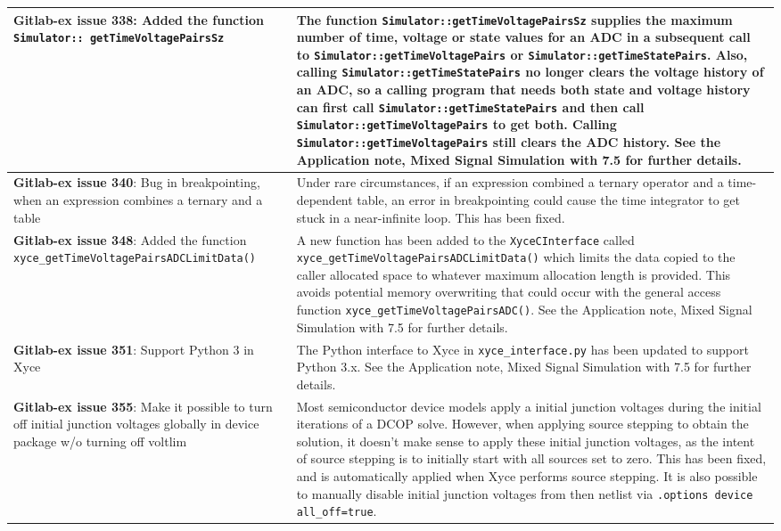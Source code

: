 {\begin{longtable}[h] {>{\raggedright\small}m{2in}|>{\raggedright\let\\\tabularnewline\small}m{3.5in}}
\textbf{Gitlab-ex issue 338}: Added the function \texttt{Simulator:: getTimeVoltagePairsSz} &
The function \texttt{Simulator::getTimeVoltagePairsSz} supplies the
maximum number of time, voltage or state values for an ADC in a
subsequent call to \texttt{Simulator::getTimeVoltagePairs}
or \texttt{Simulator::getTimeStatePairs}.  Also,
calling \texttt{Simulator::getTimeStatePairs} no longer clears the
voltage history of an ADC, so a calling program that needs both state
and voltage history can first
call \texttt{Simulator::getTimeStatePairs} and then call
\texttt{Simulator::getTimeVoltagePairs} to get both.  Calling
\texttt{Simulator::getTimeVoltagePairs} still clears the ADC history.
See the Application note, Mixed Signal Simulation with \Xyce{} 7.5 for further
details. \\ \hline

\textbf{Gitlab-ex issue 340}: Bug in breakpointing, when an expression combines a ternary and a table &
  Under rare circumstances, if an expression combined a ternary
  operator and a time-dependent table, an error in breakpointing could
  cause the time integrator to get stuck in a near-infinite loop.
  This has been fixed.  \\ \hline

\textbf{Gitlab-ex issue 348}:  Added the function \texttt{xyce\_getTimeVoltagePairs\-ADCLimitData()}  &
  A new function has been added to the \texttt{XyceCInterface}
  called \texttt{xyce\_getTimeVoltagePairsADCLimitData()} which limits
  the data copied to the caller allocated space to whatever maximum
  allocation length is provided.  This avoids potential memory
  overwriting that could occur with the general access
  function \texttt{xyce\_getTimeVoltagePairsADC()}.  See the
  Application note, Mixed Signal Simulation with \Xyce{} 7.5 for
  further details.  \\ \hline

\textbf{Gitlab-ex issue 351}: Support Python 3 in Xyce &
  The Python interface to Xyce in \texttt{xyce\_interface.py}
  has been updated to support Python 3.x.  See the Application note,
  Mixed Signal Simulation with \Xyce{} 7.5 for further details.  \\ \hline

\textbf{Gitlab-ex issue 355}:  Make it possible to turn off initial junction voltages globally in device package w/o turning off voltlim &
Most semiconductor device models apply a initial junction voltages
during the initial iterations of a DCOP solve.  However, when applying
source stepping to obtain the solution, it doesn't make sense to apply
these initial junction voltages, as the intent of source stepping is
to initially start with all sources set to zero.  This has been fixed,
and is automatically applied when Xyce performs source stepping.  It
is also possible to manually disable initial junction voltages from
then netlist via \texttt{.options device all\_off=true}.  \\ \hline


\end{longtable}}
